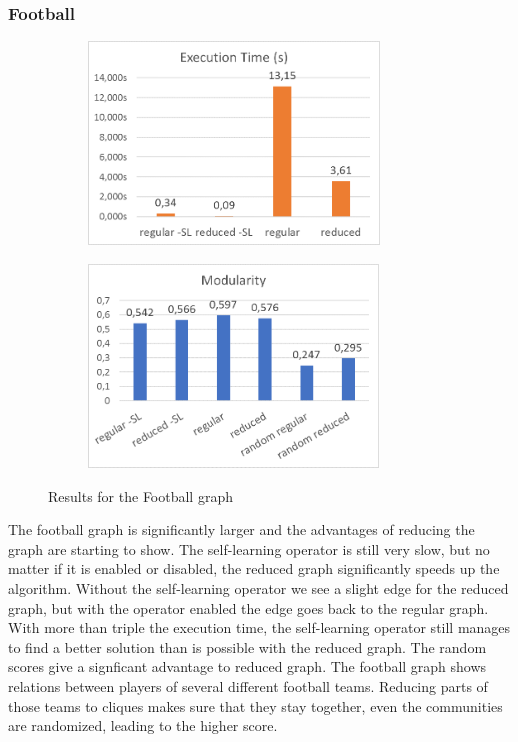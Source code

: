 \subsubsection{Football}
\begin{figure}[H]
\begin{center}
    \begin{subfigure}{0.47\textwidth}
    \begin{center}
    \includegraphics[height=5.4cm]{images/footballtime.png}
    \end{center}
    \end{subfigure}
    \begin{subfigure}{0.47\textwidth}
    \begin{center}
    \includegraphics[height=5.4cm]{images/footballfitness.png}
    \end{center}
    \end{subfigure}
\caption{Results for the Football graph}\label{fig:football}
\end{center}
\end{figure}
The football graph is significantly larger and the advantages of reducing the graph are starting to show. The self-learning operator is still very slow, but no matter if it is enabled or disabled, the reduced graph significantly speeds up the algorithm. Without the self-learning operator we see a slight edge for the reduced graph, but with the operator enabled the edge goes back to the regular graph. With more than triple the execution time, the self-learning operator still manages to find a better solution than is possible with the reduced graph. The random scores give a signficant advantage to reduced graph. The football graph shows relations between players of several different football teams. Reducing parts of those teams to cliques makes sure that they stay together, even the communities are randomized, leading to the higher score.

